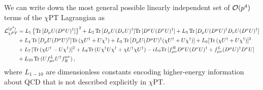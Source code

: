 We can write down the most general possible linearly independent set of $\mathcal{O}(p^4)$ terms of the $\chi$PT Lagrangian as
\begin{align}\label{eq:chipt-o4}
	\mathcal{L}_{\chi PT}^{(p^4)}& = L_1 \left\{\text{Tr\,}[D_{\mu}U (D^{\mu}U)^{\dagger}] \right\}^2
	+ L_2 \,\text{Tr\,} [D_{\mu}U (D_{\nu}U)^{\dagger}]
	\text{Tr\,} [D^{\mu}U (D^{\nu}U)^{\dagger}]
	+ L_3 \,\text{Tr\,}[
	D_{\mu}U (D^{\mu}U)^{\dagger}D_{\nu}U (D^{\nu}U)^{\dagger}]
    \nonumber\\
     &+ L_4\, \text{Tr\,} [ D_{\mu}U (D^{\mu}U)^{\dagger} ]
	\text{Tr\,} ( \chi U^{\dagger}+ U \chi^{\dagger} )
	+ L_5 \,\text{Tr\,} [ D_{\mu}U (D^{\mu}U)^{\dagger}
	(\chi U^{\dagger}+ U \chi^{\dagger})]
	+ L_6 [\text{Tr\,} ( \chi U^{\dagger}+ U \chi^{\dagger}  )
	]^2
    \nonumber\\
    & + L_7\,[ \text{Tr\,} ( \chi U^{\dagger} - U \chi^{\dagger})]^2
	 + L_8 \text{Tr\,} ( U \chi^{\dagger} U \chi^{\dagger}
	+ \chi U^{\dagger} \chi U^{\dagger})
	 -i L_9 \text{Tr\,}[ f^R_{\mu\nu} D^{\mu} U (D^{\nu} U)^{\dagger}+ f^L_{\mu\nu} (D^{\mu} U)^{\dagger} D^{\nu} U ]
    \nonumber\\
	& + L_{10}\,\text{Tr\,} ( U f^L_{\mu\nu} U^{\dagger} f_R^{\mu\nu})\,,
\end{align}
where $L_{1-10}$ are dimensionless constants encoding higher-energy information about QCD that is not described explicitly in $\chi$PT.\\

